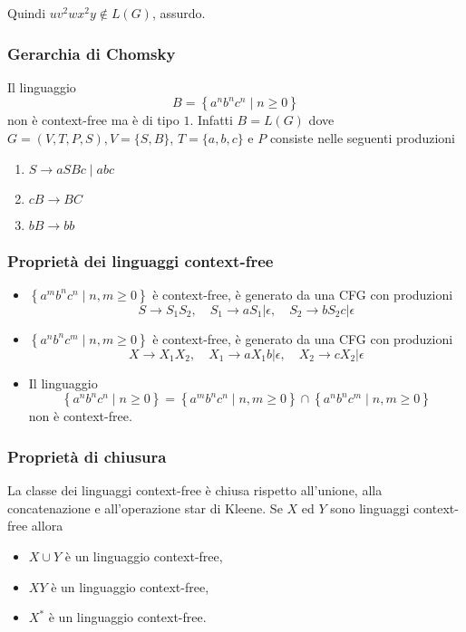 Quindi $u v^{2} w x^{2} y \notin L(G)$, assurdo.

\subsubsection{Gerarchia di Chomsky}

Il linguaggio
$$
B=\left\{a^{n} b^{n} c^{n} \mid n \geq 0\right\}
$$
non è context-free ma è di tipo $1 .$
Infatti $B=L(G)$ dove $G=(V, T, P, S), V=\{S, B\}$, $T=\{a, b, c\}$ e $P$ consiste nelle seguenti produzioni
\begin{enumerate}
    \item $S \rightarrow a S B c \mid a b c$
    \item $c B \rightarrow B C$
    \item $b B \rightarrow b b$
\end{enumerate}

\subsubsection{Proprietà dei linguaggi context-free}
\begin{itemize}
    \item $\left\{a^{m} b^{n} c^{n} \mid n, m \geq 0\right\}$ è context-free, è generato da una CFG con produzioni
$$
S \rightarrow S_{1} S_{2}, \quad S_{1} \rightarrow a S_{1}\left|\epsilon, \quad S_{2} \rightarrow b S_{2} c\right| \epsilon
$$
    \item $\left\{a^{n} b^{n} c^{m} \mid n, m \geq 0\right\}$ è context-free, è generato da una CFG con produzioni
$$
X \rightarrow X_{1} X_{2}, \quad X_{1} \rightarrow a X_{1} b\left|\epsilon, \quad X_{2} \rightarrow c X_{2}\right| \epsilon
$$
    \item Il linguaggio
$$
\left\{a^{n} b^{n} c^{n} \mid n \geq 0\right\}=\left\{a^{m} b^{n} c^{n} \mid n, m \geq 0\right\} \cap\left\{a^{n} b^{n} c^{m} \mid n, m \geq 0\right\}
$$
non è context-free.
\end{itemize}

\subsubsection{Proprietà di chiusura}

La classe dei linguaggi context-free è chiusa rispetto all'unione, alla concatenazione e all'operazione star di Kleene.
Se $X$ ed $Y$ sono linguaggi context-free allora
\begin{itemize}
    \item $X \cup Y$ è un linguaggio context-free,
    \item $X Y$ è un linguaggio context-free,
    \item $X^{*}$ è un linguaggio context-free.
\end{itemize}

